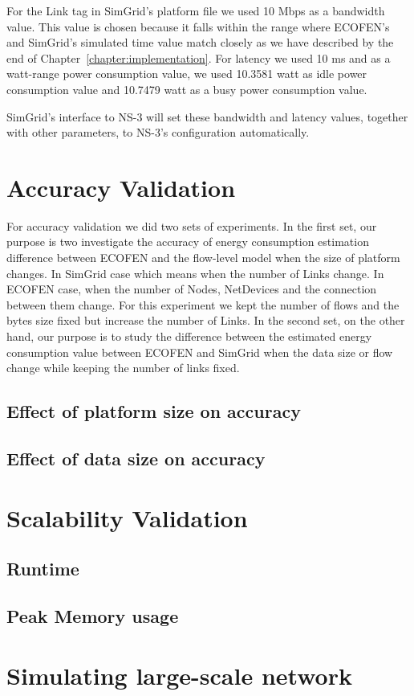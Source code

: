 For the Link tag in SimGrid's platform file we used 10 Mbps  as a bandwidth value. This value is chosen because it falls within the range where ECOFEN's and SimGrid's simulated time value match closely as we have described by the end of Chapter~\ref{chapter:implementation}. For latency we used 10 ms and as a watt-range power consumption value, we used 10.3581 watt as idle power consumption value and 10.7479 watt as a busy power consumption value. 

SimGrid's interface to NS-3 will set these bandwidth and latency values, together with other parameters, to NS-3's configuration automatically. 

\section{Accuracy Validation}

For accuracy validation we did two sets of experiments. In the first set, our purpose is two investigate the accuracy of energy consumption estimation difference between ECOFEN and the flow-level model when the size of platform changes. In SimGrid case which means when the number of Links change. In ECOFEN case, when the number of Nodes, NetDevices and the connection between them change. For this experiment we kept the number of flows and the bytes size fixed but increase the number of Links. In the second set, on the other hand, our purpose is to study the difference between the estimated energy consumption value between ECOFEN and SimGrid when the data size or flow change while keeping the number of links fixed.

\subsection{Effect of platform size on accuracy}

\subsection{Effect of data size on accuracy}
  
\section{Scalability Validation}

\subsection{Runtime}

\subsection{Peak Memory usage}

\section{Simulating large-scale network}
